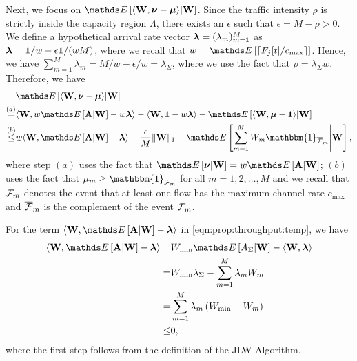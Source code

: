 \documentclass[10pt, conference, letterpaper]{IEEEtran} %
\begin{document}
Next, we focus on $\bE\left[\langle\mb{W},\bs{\nu}-\bs{\mu}\rangle\middle|\mb{W}\right]$. Since the traffic intensity $\rho$ is strictly inside the capacity region $\Lambda$, there exists an $\epsilon$ such that $\epsilon=M-\rho>0$. We define a hypothetical arrival rate vector $\boldsymbol{\lambda}=(\lambda_m)_{m=1}^{M}$ as $\boldsymbol{\lambda}=\mathbf{1}/w-\epsilon\mathbf{1}/(wM)$, where we recall that $w=\bE\left[\lceil F_j[t]/c_{\max}\rceil\right]$. Hence, we have $\sum_{m=1}^{M}\lambda_m=M/w-\epsilon/w=\lambda_{\Sigma}$, where we use the fact that $\rho=\lambda_{\Sigma}w$. Therefore, we have 
\begin{align}
\label{eqn:prop:throughput:temp}
&\bE\left[\langle\mb{W},\bs{\nu}-\bs{\mu}\rangle\middle|\mb{W}\right]\nonumber\\
\stackrel{(a)}{=}&\langle\mb{W},w\bE\left[\mb{A}\middle|\mb{W}\right]-w\bs{\lambda}\rangle - \langle\mb{W}, \mb{1} - w\bs{\lambda}\rangle-\bE\left[\langle\mb{W}, \bs{\mu}-\mb{1}\rangle\middle|\mb{W}\right]\nonumber\\
\stackrel{(b)}{\leq}&w\langle\mb{W},\bE\left[\mb{A}\middle|\mb{W}\right]-\bs{\lambda}\rangle-\frac{\epsilon}{M}\|\mb{W}\|_{1}+\bE\left[\sum_{m=1}^{M}W_m\mathbbm{1}_{\ol{\mc{F}}_m}\middle|\mb{W}\right],
\end{align}
where step $(a)$ uses the fact that $\bE\left[\bs{\nu}\middle|\mb{W}\right]=w\bE\left[\mb{A}\middle|\mb{W}\right]$; $(b)$ uses the fact that 
$\mu_m\geq\mathbbm{1}_{\mc{F}_m}$ for all $m=1,2,\ldots,M$ and we recall that $\mathcal{F}_m$ denotes the event that at least one flow has the maximum channel rate $c_{\max}$ and $\overline{\mathcal{F}}_m$ is the complement of the event $\mathcal{F}_m$.

For the term $\langle\mb{W},\bE\left[\mb{A}\middle|\mb{W}\right]-\bs{\lambda}\rangle$ in \eqref{eqn:prop:throughput:temp}, we have
\begin{align}
\label{eqn:prop:throughput:temp1}
\langle\mb{W},\bE\left[\mb{A}\middle|\mb{W}\right]-\bs{\lambda}\rangle
=& W_{\min}\bE\left[A_{\Sigma}\middle|\mb{W}\right]-\langle\mb{W},\bs{\lambda}\rangle \nonumber\\
=&W_{\min}\lambda_{\Sigma}-\sum_{m=1}^{M}\lambda_mW_m\nonumber\\
=&\sum_{m=1}^{M}\lambda_m\left(W_{\min} - W_{m}\right)\nonumber\\
\leq&0,
\end{align}
where the first step follows from the definition of the JLW Algorithm.
\end{document}
